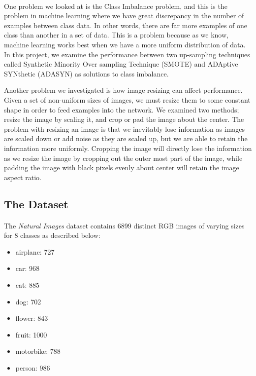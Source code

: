\documentclass{article}
\begin{document}
\paragraph{}
One problem we looked at is the Class Imbalance problem, and this is the problem in machine learning where we have great discrepancy in the number of examples between class data. In other words, there are far more examples of one class than another in a set of data. This is a problem because as we know, machine learning works best when we have a more uniform distribution of data. In this project, we examine the performance between two up-sampling techniques called Synthetic Minority Over sampling Technique (SMOTE) and ADAptive SYNthetic (ADASYN) as solutions to class imbalance. 
\par
Another problem we investigated is how image resizing can affect performance. Given a set of non-uniform sizes of images, we must resize them to some constant shape in order to feed examples into the network. We examined two methods; resize the image by scaling it, and crop or pad the image about the center. The problem with resizing an image is that we inevitably lose information as images are scaled down or add noise as they are scaled up, but we are able to retain the information more uniformly. Cropping the image will directly lose the information as we resize the image by cropping out the outer most part of the image, while padding the image with black pixels evenly about center will retain the image aspect ratio.

\subsection{The Dataset}
\paragraph{}
The {\em Natural Images} dataset contains 6899 distinct RGB images of varying sizes for 8 classes as described below:
\begin{multicols}{2}

\begin{itemize}
	\item airplane: 727 
	\item car: 968
	\item cat: 885
	\item dog: 702
	\item flower: 843
	\item fruit: 1000
	\item motorbike: 788
	\item person: 986
\end{itemize} 

\end{multicols}
\end{document}
